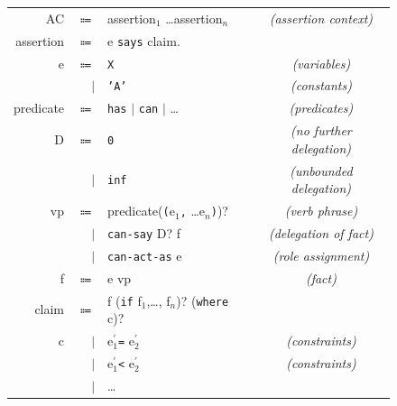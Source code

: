 \documentclass[thesis.tex]{subfiles}
\begin{document}
\newcommand{\bnfcomment}[1]{\slshape{\sffamily(#1)}}
\newcommand{\secpal}[1]{{\color{BrickRed}\texttt{#1}}}
\begin{figure}\footnotesize\centering\sffamily
  \begin{tabular}{r r l c}
    AC         & $\Coloneqq$ & assertion$_1$ \dots assertion$_n$                      & \bnfcomment{assertion context} \\
    assertion  & $\Coloneqq$ & e \secpal{says} claim.                          \\
    e          & $\Coloneqq$ & \secpal{X}                                       & \bnfcomment{variables}         \\
               & $\vert$     & \secpal{'A'}                                     & \bnfcomment{constants}         \\
    predicate  & $\Coloneqq$ & \secpal{has} $\vert$ \secpal{can} $\vert$ \dots  & \bnfcomment{predicates}        \\
    D          & $\Coloneqq$ & \secpal{0}                                               & \bnfcomment{no further delegation}     \\
               & $\vert$     & \secpal{inf}                                        & \bnfcomment{unbounded delegation}        \\
    vp         & $\Coloneqq$ & predicate(\secpal{(}e$_1$\secpal{,} \dots e$_n$\secpal{)})?                          & \bnfcomment{verb phrase}       \\
               & $\vert$     & \secpal{can-say} D? f                      & \bnfcomment{delegation of fact} \\
               & $\vert$     & \secpal{can-act-as}  e                         & \bnfcomment{role assignment} \\
    f          & $\Coloneqq$ & e vp                                             & \bnfcomment{fact}              \\
    claim      & $\Coloneqq$ & f (\secpal{if} f$_1$,\dots, f$_n$)? (\secpal{where} c)?             \\
    c          & $\vert$     & e$^\prime_1 $\secpal{=} e$^\prime_2$                      & \bnfcomment{constraints}       \\
               & $\vert$     & e$^\prime_1 $\secpal{<} e$^\prime_2$                      & \bnfcomment{constraints}       \\
               & $\vert$     & \dots                                           \\

\end{tabular}
\end{figure}
\end{document}
